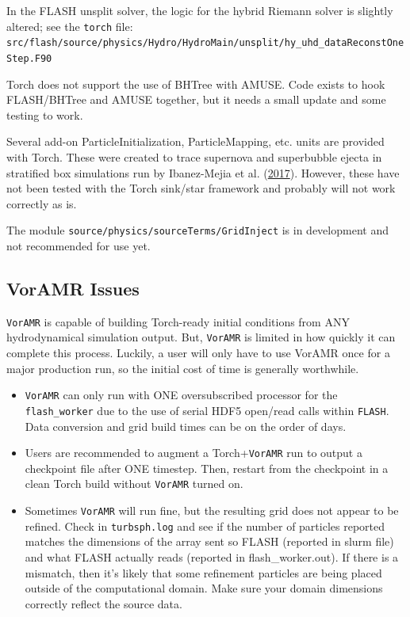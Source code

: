 \documentclass[10pt]{article}
\begin{document}

In the FLASH unsplit solver, the logic for the hybrid Riemann solver is
slightly altered; see the \texttt{torch} file: \\
\texttt{src/flash/source/physics/Hydro/HydroMain/unsplit/hy\_uhd\_dataReconstOneStep.F90}

Torch does not support the use of BHTree with AMUSE.  Code exists to hook
FLASH/BHTree and AMUSE together, but it needs a small update and some testing
to work.

Several add-on ParticleInitialization, ParticleMapping, etc. units are provided
with Torch.  These were created to trace supernova and superbubble ejecta in
stratified box simulations run by Ibanez-Mejia et al.
(\href{https://iopscience.iop.org/article/10.3847/1538-4357/aa93fe}{2017}).
However, these have not been tested with the Torch sink/star framework and
probably will not work correctly as is.

The module \texttt{source/physics/sourceTerms/GridInject} is in development and
not recommended for use yet.

\subsection{VorAMR Issues}
\texttt{VorAMR} is capable of building Torch-ready initial conditions from ANY hydrodynamical simulation output. But, \texttt{VorAMR} is limited in how quickly it can complete this process. Luckily, a user will only have to use VorAMR once for a major production run, so the initial cost of time is generally worthwhile.
\begin{itemize}
	\item \texttt{VorAMR} can only run with ONE oversubscribed processor for the \texttt{flash\_worker} due to the use of serial HDF5 open/read calls within \texttt{FLASH}. Data conversion and grid build times can be on the order of days.
	\item Users are recommended to augment a Torch+\texttt{VorAMR} run to output a checkpoint file after ONE timestep. Then, restart from the checkpoint in a clean Torch build without \texttt{VorAMR} turned on.
	\item Sometimes \texttt{VorAMR} will run fine, but the resulting grid does not appear to be refined. Check in \texttt{turbsph.log} and see if the number of particles reported matches the dimensions of the array sent so FLASH (reported in slurm file) and what FLASH actually reads (reported in flash\_worker.out). If there is a mismatch, then it's likely that some refinement particles are being placed outside of the computational domain. Make sure your domain dimensions correctly reflect the source data.
\end{itemize}
\end{document}

